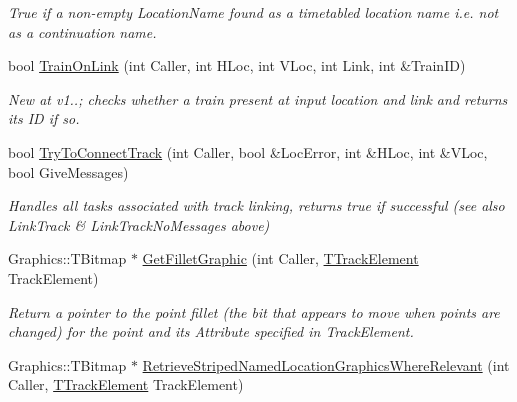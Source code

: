 \begin{DoxyCompactItemize}
\begin{DoxyCompactList}\small\item\em True if a non-\/empty Location\+Name found as a timetabled location name i.\+e. not as a continuation name. \end{DoxyCompactList}\item 
\mbox{\label{class_t_track_a12d4069a6a201e13a83347c555a465b2}} 
bool \mbox{\hyperlink{class_t_track_a12d4069a6a201e13a83347c555a465b2}{Train\+On\+Link}} (int Caller, int H\+Loc, int V\+Loc, int Link, int \&Train\+ID)
\begin{DoxyCompactList}\small\item\em New at v1..; checks whether a train present at input location and link and returns its ID if so. \end{DoxyCompactList}\item 
\mbox{\label{class_t_track_ac1dc75f1df6278c62f13e23469b80982}} 
bool \mbox{\hyperlink{class_t_track_ac1dc75f1df6278c62f13e23469b80982}{Try\+To\+Connect\+Track}} (int Caller, bool \&Loc\+Error, int \&H\+Loc, int \&V\+Loc, bool Give\+Messages)
\begin{DoxyCompactList}\small\item\em Handles all tasks associated with track linking, returns true if successful (see also Link\+Track \& Link\+Track\+No\+Messages above) \end{DoxyCompactList}\item 
\mbox{\label{class_t_track_a28019284fc6a90e06fc4b27e011484fa}} 
Graphics\+::\+T\+Bitmap $\ast$ \mbox{\hyperlink{class_t_track_a28019284fc6a90e06fc4b27e011484fa}{Get\+Fillet\+Graphic}} (int Caller, \mbox{\hyperlink{class_t_track_element}{T\+Track\+Element}} Track\+Element)
\begin{DoxyCompactList}\small\item\em Return a pointer to the point fillet (the bit that appears to move when points are changed) for the point and its Attribute specified in Track\+Element. \end{DoxyCompactList}\item 
Graphics\+::\+T\+Bitmap $\ast$ \mbox{\hyperlink{class_t_track_a10027e5b78eb6dfdc246613d78aab53e}{Retrieve\+Striped\+Named\+Location\+Graphics\+Where\+Relevant}} (int Caller, \mbox{\hyperlink{class_t_track_element}{T\+Track\+Element}} Track\+Element)
\item 

\end{DoxyCompactItemize}
